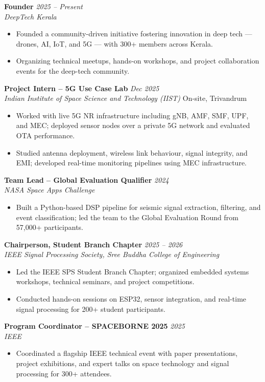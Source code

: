 \documentclass[10pt,a4paper]{article}
\newcommand{\role}[2]{\textbf{#1} \hfill \textit{#2}}
\newcommand{\org}[2]{\textit{#1} \hfill #2}
\begin{document}
\role{Founder}{2025 -- Present} \\
\org{DeepTech Kerala}{}
\begin{itemize}
    \item Founded a community-driven initiative fostering innovation in deep tech — drones, AI, IoT, and 5G — with 300+ members across Kerala.
    \item Organizing technical meetups, hands-on workshops, and project collaboration events for the deep-tech community.
\end{itemize}

\role{Project Intern -- 5G Use Case Lab}{Dec 2025} \\
\org{Indian Institute of Space Science and Technology (IIST)}{On-site, Trivandrum}
\begin{itemize}
    \item Worked with live 5G NR infrastructure including gNB, AMF, SMF, UPF, and MEC; deployed sensor nodes over a private 5G network and evaluated OTA performance.
    \item Studied antenna deployment, wireless link behaviour, signal integrity, and EMI; developed real-time monitoring pipelines using MEC infrastructure.
\end{itemize}

\role{Team Lead -- Global Evaluation Qualifier}{2024} \\
\org{NASA Space Apps Challenge}{}
\begin{itemize}
    \item Built a Python-based DSP pipeline for seismic signal extraction, filtering, and event classification; led the team to the Global Evaluation Round from 57,000+ participants.
\end{itemize}

\role{Chairperson, Student Branch Chapter}{2025 -- 2026} \\
\org{IEEE Signal Processing Society, Sree Buddha College of Engineering}{}
\begin{itemize}
    \item Led the IEEE SPS Student Branch Chapter; organized embedded systems workshops, technical seminars, and project competitions.
    \item Conducted hands-on sessions on ESP32, sensor integration, and real-time signal processing for 200+ student participants.
\end{itemize}

\role{Program Coordinator -- SPACEBORNE 2025}{2025} \\
\org{IEEE}{}
\begin{itemize}
    \item Coordinated a flagship IEEE technical event with paper presentations, project exhibitions, and expert talks on space technology and signal processing for 300+ attendees.
\end{itemize}
\end{document}
